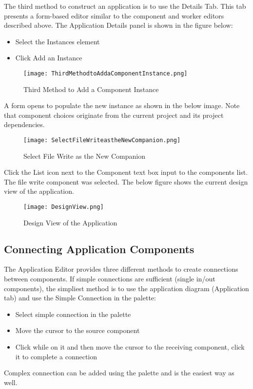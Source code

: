 \documentclass[10pt, a4paper, oneside]{article}
\begin{document}
The third method to construct an application is to use the Details Tab. This tab presents a form-based editor similar to the component and worker editors described above. The Application Details panel is shown in the figure below:\\

\begin{itemize}
\item	Select the Instances element
\item	Click Add an Instance
\end{itemize}
\begin{figure}[h!]
	\centering
	\caption{Third Method to Add a Component Instance}{}
	\texttt{[image: ThirdMethodtoAddaComponentInstance.png]}
 \end{figure}
A form opens to populate the new instance as shown in the below image. Note that component choices originate from the current project and its project dependencies.\\
\begin{figure}[h!]
	\centering
	\caption{Select File Write as the New Companion}{}
	\texttt{[image: SelectFileWriteastheNewCompanion.png]}
 \end{figure}

Click the List icon next to the Component text box input to the components list. The file write component was selected. The below figure shows the current design view of the application.
\begin{figure}[h!]
	\centering
	\caption{Design View of the Application}{}
	\texttt{[image: DesignView.png]}
 \end{figure}
\subsection{Connecting Application Components}
The Application Editor provides three different methods to create connections between components. If simple connections are sufficient (single in/out components), the simpliest method is to use the application diagram (Application tab) and use the Simple Connection in the palette:
\begin{itemize}
\item Select simple connection in the palette
\item Move the cursor to the source component
\item Click while on it and then move the cursor to the receiving component, click it to complete a connection
\end{itemize}
Complex connection can be added using the palette and is the easiest way as well. \\
\end{document}
